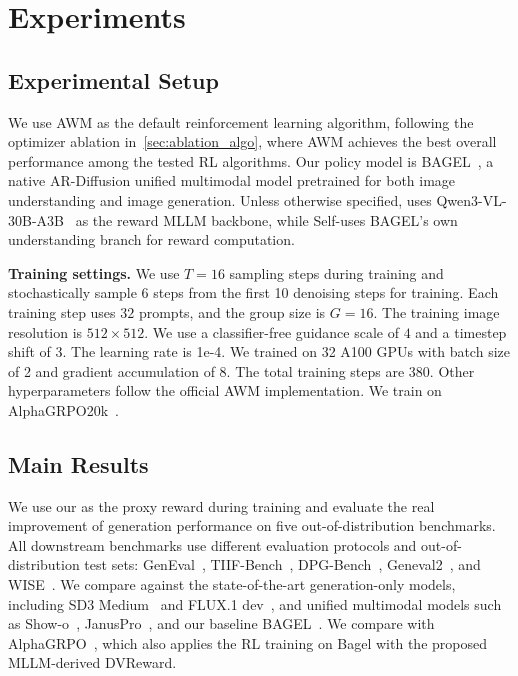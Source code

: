 \section{Experiments}
\label{sec:experiments}

\subsection{Experimental Setup}
\label{sec:implementation}
We use AWM as the default reinforcement learning algorithm, following the
optimizer ablation in~\autoref{sec:ablation_algo}, where AWM achieves the
best overall performance among the tested RL algorithms.
Our policy model is BAGEL~\cite{bagel}, a native AR-Diffusion unified multimodal model pretrained for both image understanding and image generation.
Unless otherwise specified, \method uses Qwen3-VL-30B-A3B~\cite{qwen3vl} as the
reward MLLM backbone, while Self-\method uses BAGEL's own understanding
branch for reward computation.

\noindent \textbf{Training settings.} 
We use $T=16$ sampling steps during training and stochastically sample 6 steps from the first 10 denoising steps for training. 
Each training step uses $32$ prompts, and the group size is $G=16$. The
training image resolution is $512 \times 512$. We use a classifier-free
guidance scale of $4$ and a timestep shift of $3$. The learning rate is 1e-4.
We trained on 32 A100 GPUs with batch size of 2 and gradient accumulation of 8.
The total training steps are 380.  Other hyperparameters
follow the official AWM implementation. We train on AlphaGRPO20k~\citep{alphagrpo}.

\subsection{Main Results}
\label{sec:main_results}
We use our \method as the proxy reward during training and evaluate the real improvement of generation performance on five out-of-distribution benchmarks.
All downstream benchmarks use different evaluation protocols and out-of-distribution test sets: 
GenEval~\cite{geneval}, TIIF-Bench~\cite{tiif}, DPG-Bench~\cite{dpg}, Geneval2~\cite{kamath2025geneval}, and WISE~\cite{wise}.
We compare against the state-of-the-art generation-only models, 
including SD3 Medium~\cite{sd3} and FLUX.1 dev~\cite{flux}, and {unified multimodal models} such as 
Show-o~\cite{showo}, JanusPro~\cite{januspro}, and our baseline BAGEL~\cite{bagel}. 
We compare with AlphaGRPO~\cite{alphagrpo}, which also applies the RL training on Bagel with the proposed MLLM-derived DVReward.


